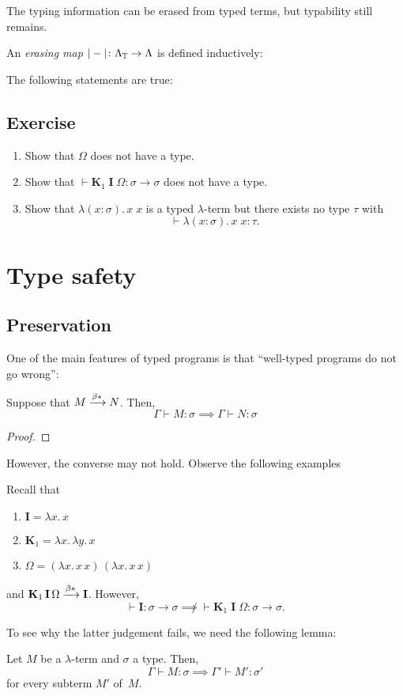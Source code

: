 The typing information can be erased from typed terms, but typability still
remains.
\begin{definition}
  An \emph{erasing map} $|-|\colon \Lambda_{\mathbb{T}} \to \Lambda$ is defined inductively:
\end{definition}
\begin{proposition}
  The following statements are true:
\end{proposition}
\subsection*{Exercise}
\begin{enumerate}
  \item Show that $\Omega$ does not have a type.
  \item Show that $\vdash \mathbf{K}_1\;\mathbf{I}\;\Omega : \sigma \to \sigma$
    does not have a type.
  \item Show that $\lambda (x : \sigma).\, x\; x$ is a typed $\lambda$-term but
    there exists no type $\tau$ with 
    \[
      \vdash \lambda (x : \sigma).\, x\; x : \tau.
    \]
  \end{enumerate}
\section{Type safety}
\subsection{Preservation}
One of the main features of typed programs is that ``well-typed programs do not
go wrong'':
\begin{theorem}[Preservation]
  Suppose that $M \xrightarrow{\beta*} N$. Then, 
  \[
    \Gamma \vdash M : \sigma \implies \Gamma \vdash N : \sigma
  \]
\end{theorem}
\begin{proof}
\end{proof}
However, the converse may not hold. Observe the following examples
\begin{example}
  Recall that 
  \begin{enumerate}
    \item $\mathbf{I} = \lambda x.\, x$
    \item $\mathbf{K}_1 = \lambda x.\, \lambda y.\, x$
    \item $\Omega = (\lambda x.\, x\,x)\,(\lambda x.\, x\,x)$
  \end{enumerate}
  and $\mathbf{K}_1\,\mathbf{I}\,\Omega \xrightarrow{\beta*} \mathbf{I}$. However, 
  \[
    \vdash \mathbf{I} : \sigma \to \sigma
    \not\implies
    \vdash \mathbf{K}_1\;\mathbf{I}\;\Omega : \sigma \to \sigma.
  \]
\end{example}
To see why the latter judgement fails, we need the following lemma:
\begin{lemma}
  Let $M$ be a  $\lambda$-term and $\sigma$ a type. Then,  
  \[
    \Gamma \vdash M : \sigma 
    \implies \Gamma' \vdash M' : \sigma'
  \]
  for every subterm $M'$ of~$M$.
\end{lemma}
